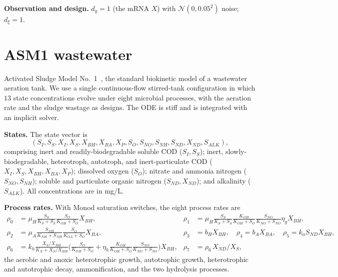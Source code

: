 \textbf{Observation and design.} $d_y=1$ (the mRNA $X$) with $\mathcal N(0,0.05^2)$ noise;
$d_\xi=1$.

\section{ASM1 wastewater}
Activated Sludge Model No.~1~\citep{henze2000activated}, the standard biokinetic model of
a wastewater aeration tank. We use a single continuous-flow stirred-tank configuration in
which $13$ state concentrations evolve under eight microbial processes, with the aeration
rate and the sludge wastage as designs. The ODE is stiff and is integrated with an
implicit solver.

\textbf{States.} The state vector is
\[
(S_I,S_S,X_I,X_S,X_{BH},X_{BA},X_P,S_O,S_{NO},S_{NH},S_{ND},X_{ND},S_{ALK}),
\]
comprising inert and readily-biodegradable soluble COD ($S_I,S_S$); inert,
slowly-biodegradable, heterotroph, autotroph, and inert-particulate COD
($X_I,X_S,X_{BH},X_{BA},X_P$); dissolved oxygen ($S_O$); nitrate and ammonia nitrogen
($S_{NO},S_{NH}$); soluble and particulate organic nitrogen ($S_{ND},X_{ND}$); and
alkalinity ($S_{ALK}$). All concentrations are in mg/L.

\textbf{Process rates.} With Monod saturation switches, the eight process rates are
\begin{align*}
\rho_0 &= \mu_H\tfrac{S_S}{K_S+S_S}\tfrac{S_O}{K_{OH}+S_O}X_{BH}, &
\rho_1 &= \mu_H\tfrac{S_S}{K_S+S_S}\tfrac{K_{OH}}{K_{OH}+S_O}\tfrac{S_{NO}}{K_{NO}+S_{NO}}\eta_g X_{BH},\\
\rho_2 &= \mu_A\tfrac{S_{NH}}{K_{NH}+S_{NH}}\tfrac{S_O}{K_{OA}+S_O}X_{BA}, &
\rho_3 &= b_H X_{BH},\quad \rho_4=b_A X_{BA},\quad \rho_5=k_a S_{ND}X_{BH},\\
\rho_6 &= k_h\tfrac{X_S/X_{BH}}{K_X+X_S/X_{BH}}\big(\tfrac{S_O}{K_{OH}+S_O}+\eta_h\tfrac{K_{OH}}{K_{OH}+S_O}\tfrac{S_{NO}}{K_{NO}+S_{NO}}\big)X_{BH}, &
\rho_7 &= \rho_6\,X_{ND}/X_S,
\end{align*}
the aerobic and anoxic heterotrophic growth, autotrophic growth, heterotrophic and
autotrophic decay, ammonification, and the two hydrolysis processes.


